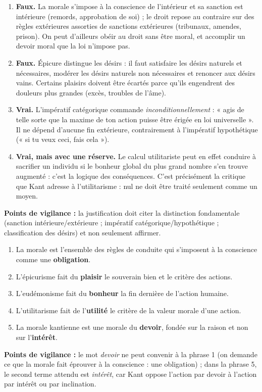 \documentclass[11pt]{article}
\begin{document}
\begin{corrige}
\begin{enumerate}
\item \textbf{Faux.} La morale s'impose à la conscience de l'intérieur et sa sanction est intérieure (remords, approbation de soi) ; le droit repose au contraire sur des règles extérieures assorties de sanctions extérieures (tribunaux, amendes, prison). On peut d'ailleurs obéir au droit sans être moral, et accomplir un devoir moral que la loi n'impose pas.
\item \textbf{Faux.} Épicure distingue les désirs : il faut satisfaire les désirs naturels et nécessaires, modérer les désirs naturels non nécessaires et renoncer aux désirs vains. Certains plaisirs doivent être écartés parce qu'ils engendrent des douleurs plus grandes (excès, troubles de l'âme).
\item \textbf{Vrai.} L'impératif catégorique commande \emph{inconditionnellement} : « agis de telle sorte que la maxime de ton action puisse être érigée en loi universelle ». Il ne dépend d'aucune fin extérieure, contrairement à l'impératif hypothétique (« si tu veux ceci, fais cela »).
\item \textbf{Vrai, mais avec une réserve.} Le calcul utilitariste peut en effet conduire à sacrifier un individu si le bonheur global du plus grand nombre s'en trouve augmenté : c'est la logique des conséquences. C'est précisément la critique que Kant adresse à l'utilitarisme : nul ne doit être traité seulement comme un moyen.
\end{enumerate}
\textbf{Points de vigilance :} la justification doit citer la distinction fondamentale (sanction intérieure/extérieure ; impératif catégorique/hypothétique ; classification des désirs) et non seulement affirmer.
\end{corrige}

\begin{corrige}
\begin{enumerate}
\item La morale est l'ensemble des règles de conduite qui s'imposent à la conscience comme une \textbf{obligation}.
\item L'épicurisme fait du \textbf{plaisir} le souverain bien et le critère des actions.
\item L'eudémonisme fait du \textbf{bonheur} la fin dernière de l'action humaine.
\item L'utilitarisme fait de l'\textbf{utilité} le critère de la valeur morale d'une action.
\item La morale kantienne est une morale du \textbf{devoir}, fondée sur la raison et non sur l'\textbf{intérêt}.
\end{enumerate}
\textbf{Points de vigilance :} le mot \emph{devoir} ne peut convenir à la phrase 1 (on demande ce que la morale fait éprouver à la conscience : une obligation) ; dans la phrase 5, le second terme attendu est \emph{intérêt}, car Kant oppose l'action par devoir à l'action par intérêt ou par inclination.
\end{corrige}
\end{document}
